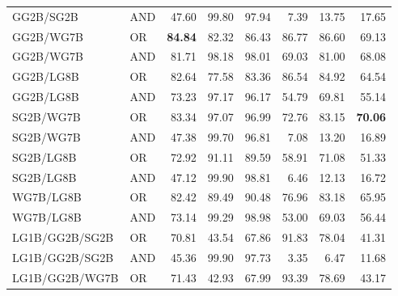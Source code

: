 \documentclass{article}
\begin{document}
{\begin{longtable}{llrrrrrr}
 GG2B/SG2B                & AND     & 47.60             & 99.80             & 97.94             & 7.39             & 13.75            & 17.65            \\
 GG2B/WG7B                & OR      & \textbf{84.84}    & 82.32             & 86.43             & 86.77            & 86.60            & 69.13            \\
 GG2B/WG7B                & AND     & 81.71             & 98.18             & 98.01             & 69.03            & 81.00            & 68.08            \\
 GG2B/LG8B                & OR      & 82.64             & 77.58             & 83.36             & 86.54            & 84.92            & 64.54            \\
 GG2B/LG8B                & AND     & 73.23             & 97.17             & 96.17             & 54.79            & 69.81            & 55.14            \\
 SG2B/WG7B                & OR      & 83.34             & 97.07             & 96.99             & 72.76            & 83.15            & \textbf{70.06}   \\
 SG2B/WG7B                & AND     & 47.38             & 99.70             & 96.81             & 7.08             & 13.20            & 16.89            \\
 SG2B/LG8B                & OR      & 72.92             & 91.11             & 89.59             & 58.91            & 71.08            & 51.33            \\
 SG2B/LG8B                & AND     & 47.12             & 99.90             & 98.81             & 6.46             & 12.13            & 16.72            \\
 WG7B/LG8B                & OR      & 82.42             & 89.49             & 90.48             & 76.96            & 83.18            & 65.95            \\
 WG7B/LG8B                & AND     & 73.14             & 99.29             & 98.98             & 53.00            & 69.03            & 56.44            \\
 LG1B/GG2B/SG2B           & OR      & 70.81             & 43.54             & 67.86             & 91.83            & 78.04            & 41.31            \\
 LG1B/GG2B/SG2B           & AND     & 45.36             & 99.90             & 97.73             & 3.35             & 6.47             & 11.68            \\
 LG1B/GG2B/WG7B           & OR      & 71.43             & 42.93             & 67.99             & 93.39            & 78.69            & 43.17            \\

\end{longtable}}
\end{document}
